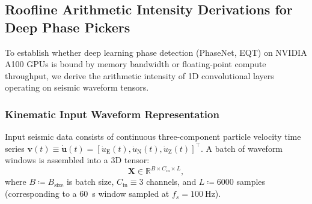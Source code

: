 
\subsection*{Roofline Arithmetic Intensity Derivations for Deep Phase Pickers}
\label{subsec:supp_roofline}

To establish whether deep learning phase detection (\ac{PhaseNet},
\ac{EQT}) on NVIDIA A100 GPUs
is bound by memory bandwidth or floating-point compute throughput,
we derive the arithmetic
intensity of 1D convolutional layers operating on seismic waveform tensors.

\subsubsection*{Kinematic Input Waveform Representation}
Input seismic data consists of continuous three-component particle
velocity time series
$\mathbf{v}(t) \equiv \dot{\mathbf{u}}(t) =
[\dot{u}_{\mathrm{E}}(t), \dot{u}_{\mathrm{N}}(t),
\dot{u}_{\mathrm{Z}}(t)]^\top$.
A batch of waveform windows is assembled into a 3D tensor:
\begin{equation}
  \mathbf{X} \in \mathbb{R}^{B \times C_{\mathrm{in}} \times L},
  \label{eq:supp_input_tensor}
\end{equation}
where $B \coloneqq B_{\mathrm{size}}$ is batch size,
$C_{\mathrm{in}} \equiv \num{3}$ channels,
and $L \coloneqq \num{6000}$ samples (corresponding to a
\qty{60}{\second} window sampled at $f_s = \qty{100}{\hertz}$).

